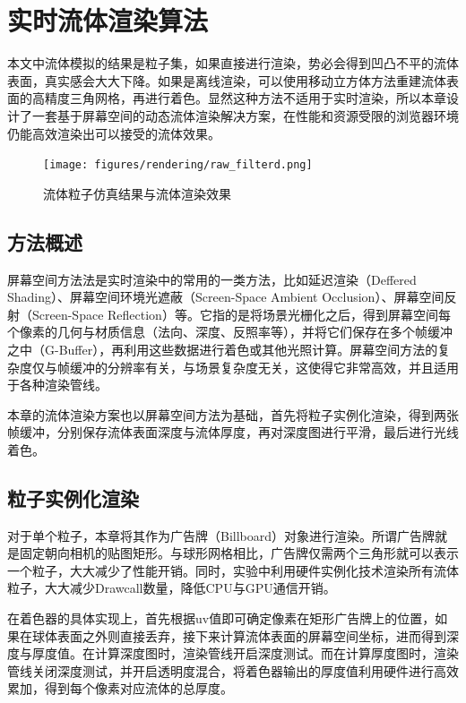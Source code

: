 \section{实时流体渲染算法}
    本文中流体模拟的结果是粒子集，如果直接进行渲染，势必会得到凹凸不平的流体表面，真实感会大大下降。如果是离线渲染，可以使用移动立方体方法\cite{LC87MC}重建流体表面的高精度三角网格，再进行着色。显然这种方法不适用于实时渲染，所以本章设计了一套基于屏幕空间的动态流体渲染解决方案，在性能和资源受限的浏览器环境仍能高效渲染出可以接受的流体效果。

    \begin{figure}[htbp]
    	\centering
    	\texttt{[image: figures/rendering/raw\_filterd.png]}
    	\caption{流体粒子仿真结果与流体渲染效果}
    \end{figure}

\subsection{方法概述}
    屏幕空间方法法是实时渲染中的常用的一类方法，比如延迟渲染（Deffered Shading）、屏幕空间环境光遮蔽（Screen-Space Ambient Occlusion）、屏幕空间反射（Screen-Space Reflection）等。它指的是将场景光栅化之后，得到屏幕空间每个像素的几何与材质信息（法向、深度、反照率等），并将它们保存在多个帧缓冲之中（G-Buffer），再利用这些数据进行着色或其他光照计算。屏幕空间方法的复杂度仅与帧缓冲的分辨率有关，与场景复杂度无关，这使得它非常高效，并且适用于各种渲染管线。
    
    本章的流体渲染方案也以屏幕空间方法为基础\cite{G10SSF}，首先将粒子实例化渲染，得到两张帧缓冲，分别保存流体表面深度与流体厚度，再对深度图进行平滑，最后进行光线着色。

\subsection{粒子实例化渲染}
    对于单个粒子，本章将其作为广告牌（Billboard）\cite{AHH19RTR}对象进行渲染。所谓广告牌就是固定朝向相机的贴图矩形。与球形网格相比，广告牌仅需两个三角形就可以表示一个粒子，大大减少了性能开销。同时，实验中利用硬件实例化技术渲染所有流体粒子，大大减少Drawcall数量，降低CPU与GPU通信开销。
    
    在着色器的具体实现上，首先根据uv值即可确定像素在矩形广告牌上的位置，如果在球体表面之外则直接丢弃，接下来计算流体表面的屏幕空间坐标，进而得到深度与厚度值。在计算深度图时，渲染管线开启深度测试。而在计算厚度图时，渲染管线关闭深度测试，并开启透明度混合，将着色器输出的厚度值利用硬件进行高效累加，得到每个像素对应流体的总厚度。

